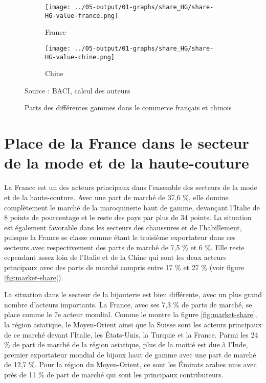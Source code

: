 \documentclass[french,10pt,a4paper]{article}
\begin{document}
\begin{figure}[!h]
  \centering
  \begin{subfigure}{\textwidth}
    \centering    
    \texttt{[image: ../05-output/01-graphs/share\_HG/share-HG-value-france.png]}
    \caption{France}
    \label{fig:share-HG-value-france}
  \end{subfigure}
  \vspace{0.5cm}
  \begin{subfigure}{\textwidth}
    \centering
 \texttt{[image: ../05-output/01-graphs/share\_HG/share-HG-value-chine.png]}
 \caption{Chine}
 \label{fig:share-HG-value-chine}
\end{subfigure}
\captionsetup{justification=raggedright,singlelinecheck=false, font=small}
  \caption*{Source : BACI, calcul des auteurs}
  \captionsetup{justification=centering, singlelinecheck=true, font=normalsize}
  \caption{Parts des différentes gammes dans le commerce français et chinois}
  \label{fig:share-HG-value-france-chine}
\end{figure}




\section{Place de la France dans le secteur de la mode et de la haute-couture}
La France est un des acteurs principaux dans l'ensemble des secteurs de la mode et de la haute-couture. Avec une part de marché de 37,6 \%, elle domine complètement le marché de la maroquinerie haut de gamme, devançant l'Italie de 8 points de pourcentage et le reste des pays par plus de 34 points. La situation est également favorable dans les secteurs des chaussures et de l'habillement, puisque la France se classe comme étant le troisième exportateur dans ces secteurs avec respectivement des parts de marché de 7,5 \% et 6 \%. Elle reste cependant assez loin de l'Italie et de la Chine qui sont les deux acteurs principaux avec des parts de marché compris entre 17 \% et 27 \% (voir figure \ref{fig:market-share}).

La situation dans le secteur de la bijouterie est bien différente, avec un plus grand nombre d'acteurs importants. La France, avec ses 7,3 \% de parts de marché, se place comme le 7e acteur mondial. Comme le montre la figure \ref{fig:market-share}, la région asiatique, le Moyen-Orient ainsi que la Suisse sont les acteurs principaux de ce marché devant l'Italie, les États-Unis, la Turquie et la France. Parmi les 24 \% de part de marché de la région asiatique, plus de la moitié est due à l'Inde, premier exportateur mondial de bijoux haut de gamme avec une part de marché de 12,7 \%. Pour la région du Moyen-Orient, ce sont les Émirats arabes unis avec près de 11 \% de part de marché qui sont les principaux contributeurs. 
\end{document}

